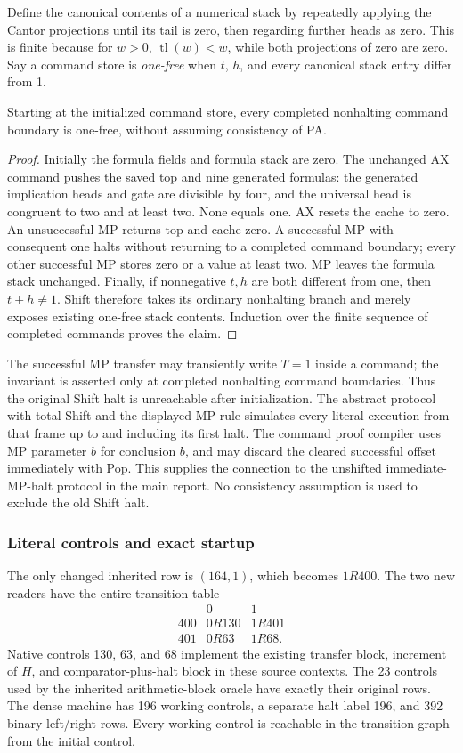 Define the canonical contents of a numerical stack by repeatedly
applying the Cantor projections until its tail is zero, then regarding
further heads as zero. This is finite because for $w>0$,
$\operatorname{tl}(w)<w$, while both projections of zero are zero.
Say a command store is \emph{one-free} when $t$, $h$, and every canonical
stack entry differ from 1.

\begin{lemma}
Starting at the initialized command store, every completed nonhalting
command boundary is one-free, without assuming consistency of PA.
\end{lemma}
\begin{proof}
Initially the formula fields and formula stack are zero. The unchanged
AX command pushes the saved top and nine generated formulas: the
generated implication heads and gate are divisible by four, and the
universal head is congruent to two and at least two. None equals one.
AX resets the cache to zero. An unsuccessful MP returns top and cache
zero. A successful MP with consequent one halts without returning to a
completed command boundary; every other successful MP stores zero or
a value at least two. MP
leaves the formula stack unchanged. Finally, if nonnegative $t,h$
are both different from one, then $t+h\ne1$. Shift therefore takes
its ordinary nonhalting branch and merely exposes existing one-free
stack contents. Induction over the finite sequence of completed commands proves
the claim.
\end{proof}

The successful MP transfer may transiently write $T=1$ inside a command;
the invariant is asserted only at completed nonhalting command boundaries.
Thus the original Shift halt is unreachable after initialization. The
abstract protocol with total Shift and the displayed MP rule simulates
every literal execution from that frame up to and including its first
halt. The command proof compiler uses MP parameter $b$ for conclusion
$b$, and may discard the cleared successful offset immediately with
Pop. This supplies the connection to the unshifted immediate-MP-halt
protocol in the main report. No consistency assumption is used to
exclude the old Shift halt.

\subsubsection{Literal controls and exact startup}

The only changed inherited row is $(164,1)$, which becomes $1R400$.
The two new readers have the entire transition table
\[
\begin{array}{c|cc}
 &0&1\\\hline
400&0R130&1R401\\
401&0R63&1R68.
\end{array}
\]
Native controls 130, 63, and 68 implement the existing transfer block,
increment of $H$, and comparator-plus-halt block in these source
contexts. The 23 controls used by the inherited arithmetic-block
oracle have exactly their original rows.
The dense machine has 196 working controls, a separate halt label 196,
and 392 binary left/right rows. Every working control is reachable in
the transition graph from the initial control.

